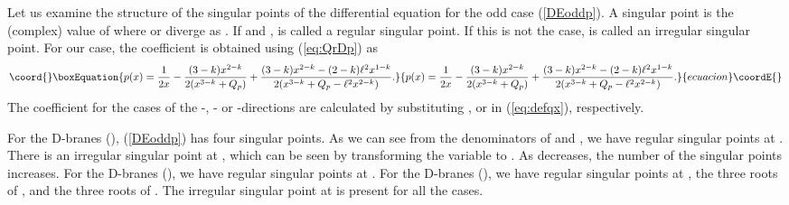 \documentclass[a4paper,12pt]{article}
\begin{document}
Let us examine the structure of the singular points
of the differential equation for the odd \coordHE{} case (\ref{DEoddp}). 
A singular point \coordHE{} is the (complex) value of 
\coordHE{} where \coordHE{} or \coordHE{} diverge as \coordHE{}. 
If \coordHE{} and \coordHE{}, 
\coordHE{} is called a regular singular point. 
If this is not the case, \coordHE{} is
called an irregular singular point. 
For our case, the coefficient \coordHE{} is
obtained using (\ref{eq:QrDp}) as
\begin{equation}\coord{}\boxEquation{
p(x)={1\over 2x}-{(3-k) x^{2-k}\over 2(x^{3-k}+Q_p)}
+{(3-k)x^{2-k}-(2-k)\ell^2 x^{1-k}\over
2(x^{3-k}+Q_p-\ell^2 x^{2-k})}.
\label{pxDp}
}{
p(x)={1\over 2x}-{(3-k) x^{2-k}\over 2(x^{3-k}+Q_p)}
+{(3-k)x^{2-k}-(2-k)\ell^2 x^{1-k}\over
2(x^{3-k}+Q_p-\ell^2 x^{2-k})}.
}{ecuacion}\coordE{}\end{equation}
The coefficient \coordHE{} for the cases of the
\coordHE{}-, \coordHE{}- or \coordHE{}-directions are calculated 
by substituting  \coordHE{}, \coordHE{} or \coordHE{} 
in (\ref{eq:defqx}), respectively.

For the D\coordHE{}-branes (\coordHE{}), (\ref{DEoddp}) has four 
singular points.
As we can see from the denominators of \coordHE{} and \coordHE{},
we have regular singular points at \coordHE{}. 
There is an irregular singular point at \coordHE{},
which can be seen by transforming  the variable \coordHE{} to \coordHE{}.
As \coordHE{} decreases, the number of the singular points increases.
For the D\coordHE{}-branes (\coordHE{}), we have regular 
singular points at \coordHE{}.
For the D\coordHE{}-branes (\coordHE{}), we have regular 
singular points at \coordHE{}, the three roots of \coordHE{}, 
and the three roots of \coordHE{}.
The irregular singular point at \coordHE{} is present for 
all the cases.
\end{document}
